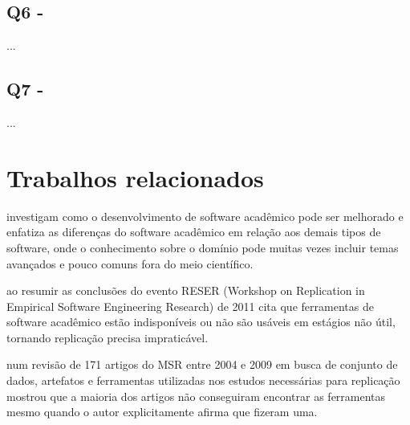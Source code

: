 
\subsection{Q6 - \QuestaoSeis} %

...

\subsection{Q7 - \QuestaoSete} %

...

\section{Trabalhos relacionados}

investigam como o desenvolvimento de software acadêmico pode ser melhorado e
enfatiza as diferenças do software acadêmico em relação aos demais tipos de
software, onde o conhecimento sobre o domínio pode muitas vezes incluir temas
avançados e pouco comuns fora do meio científico.

ao resumir as conclusões do evento RESER (Workshop on Replication in Empirical
Software Engineering Research) de 2011 cita que ferramentas de software
acadêmico estão indisponíveis ou não são usáveis em estágios não útil, tornando
replicação precisa impraticável.

 num revisão de 171 artigos do MSR entre 2004 e 2009
em busca de conjunto de dados, artefatos e ferramentas utilizadas nos estudos
necessárias para replicação mostrou que a maioria dos artigos não conseguiram encontrar
as ferramentas mesmo quando o autor explicitamente afirma que fizeram uma.


